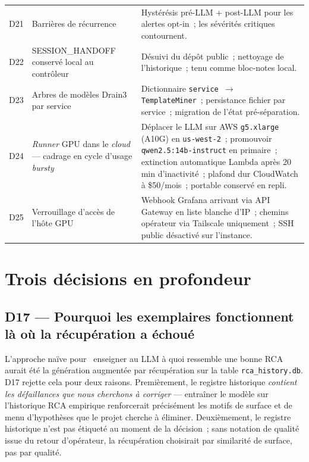 \documentclass[11pt,a4paper,oneside]{report}
\begin{document}
\begin{longtable}{p{} p{} p{}}
D21 & Barrières de récurrence
    & Hystérésis pré-LLM + post-LLM pour les alertes opt-in~; les
      sévérités critiques contournent. \\
D22 & SESSION\_HANDOFF conservé local au contrôleur
    & Désuivi du dépôt public~; nettoyage de l'historique~; tenu
      comme bloc-notes local. \\
D23 & Arbres de modèles Drain3 par service
    & Dictionnaire \texttt{service $\to$ TemplateMiner}~;
      persistance fichier par service~; migration de l'état
      pré-séparation. \\
D24 & \emph{Runner} GPU dans le \emph{cloud} --- cadrage en cycle
      d'usage \emph{bursty}
    & Déplacer le LLM sur AWS \texttt{g5.xlarge} (A10G) en
      \texttt{us-west-2}~; promouvoir
      \texttt{qwen2.5:14b-instruct} en primaire~; extinction
      automatique Lambda après 20\,min d'inactivité~; plafond dur
      CloudWatch à \$50/mois~; portable conservé en repli. \\
D25 & Verrouillage d'accès de l'hôte GPU
    & Webhook Grafana arrivant via API Gateway en liste blanche
      d'IP~; chemins opérateur via Tailscale uniquement~; SSH
      public désactivé sur l'instance. \\
\end{longtable}

\section{Trois décisions en profondeur}

\subsection{D17 --- Pourquoi les exemplaires fonctionnent là où la récupération a échoué}

L'approche naïve pour \og~enseigner au LLM à quoi ressemble une
bonne RCA~\fg{} aurait été la génération augmentée par récupération
sur la table \texttt{rca\_history.db}. D17 rejette cela pour deux
raisons. Premièrement, le registre historique \emph{contient les
défaillances que nous cherchons à corriger} --- entraîner le modèle
sur l'historique RCA empirique renforcerait précisément les motifs
de surface et de menu d'hypothèses que le projet cherche à
éliminer. Deuxièmement, le registre historique n'est pas étiqueté
au moment de la décision~; sans notation de qualité issue du retour
d'opérateur, la récupération choisirait par similarité de surface,
pas par qualité.
\end{document}

